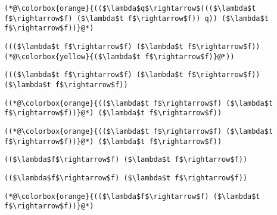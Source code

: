 \documentclass{beamer}
\begin{document}
\begin{frame}[fragile]{\CurrentSection}
\lstset{basicstyle=\ttfamily\small}\lstset{numbers=none}\lstset{language=ML}\begin{lstlisting}
(*@\colorbox{orange}{(($\lambda$q$\rightarrow$((($\lambda$t f$\rightarrow$f) ($\lambda$t f$\rightarrow$f)) q)) ($\lambda$t f$\rightarrow$f))}@*)
\end{lstlisting}
\pause\lstset{language=ML}\begin{lstlisting}
((($\lambda$t f$\rightarrow$f) ($\lambda$t f$\rightarrow$f)) (*@\colorbox{yellow}{($\lambda$t f$\rightarrow$f)}@*))
\end{lstlisting}

\end{frame}

\begin{frame}[fragile]{\CurrentSection}
\lstset{basicstyle=\ttfamily\small}\lstset{numbers=none}\lstset{language=ML}\begin{lstlisting}
((($\lambda$t f$\rightarrow$f) ($\lambda$t f$\rightarrow$f)) ($\lambda$t f$\rightarrow$f))
\end{lstlisting}
\pause\lstset{language=ML}\begin{lstlisting}
((*@\colorbox{orange}{(($\lambda$t f$\rightarrow$f) ($\lambda$t f$\rightarrow$f))}@*) ($\lambda$t f$\rightarrow$f))
\end{lstlisting}

\end{frame}

\begin{frame}[fragile]{\CurrentSection}
\lstset{basicstyle=\ttfamily\small}\lstset{numbers=none}\lstset{language=ML}\begin{lstlisting}
((*@\colorbox{orange}{(($\lambda$t f$\rightarrow$f) ($\lambda$t f$\rightarrow$f))}@*) ($\lambda$t f$\rightarrow$f))
\end{lstlisting}
\pause\lstset{language=ML}\begin{lstlisting}
(($\lambda$f$\rightarrow$f) ($\lambda$t f$\rightarrow$f))
\end{lstlisting}

\end{frame}

\begin{frame}[fragile]{\CurrentSection}
\lstset{basicstyle=\ttfamily\small}\lstset{numbers=none}\lstset{language=ML}\begin{lstlisting}
(($\lambda$f$\rightarrow$f) ($\lambda$t f$\rightarrow$f))
\end{lstlisting}
\pause\lstset{language=ML}\begin{lstlisting}
(*@\colorbox{orange}{(($\lambda$f$\rightarrow$f) ($\lambda$t f$\rightarrow$f))}@*)
\end{lstlisting}

\end{frame}
\end{document}
